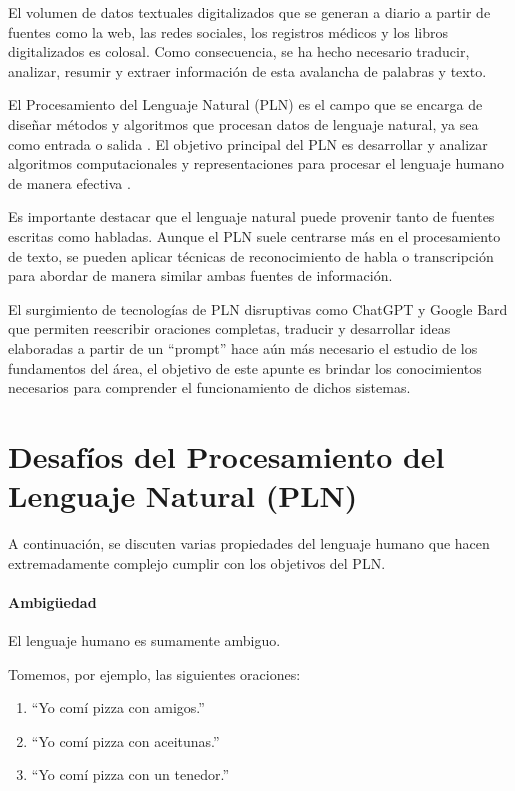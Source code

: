 El volumen de datos textuales digitalizados que se generan a diario a partir de fuentes como la web, las redes sociales, los registros médicos y los libros digitalizados es colosal. Como consecuencia, se ha hecho necesario traducir, analizar, resumir y extraer información de esta avalancha de palabras y texto.

El Procesamiento del Lenguaje Natural (PLN) es el campo que se encarga de diseñar métodos y algoritmos que procesan datos de lenguaje natural, ya sea como entrada o salida \cite{goldberg2017neural}. El objetivo principal del PLN es desarrollar y analizar algoritmos computacionales y representaciones para procesar el lenguaje humano de manera efectiva \cite{jacobbook}.

Es importante destacar que el lenguaje natural puede provenir tanto de fuentes escritas como habladas. Aunque el PLN suele centrarse más en el procesamiento de texto, se pueden aplicar técnicas de reconocimiento de habla o transcripción para abordar de manera similar ambas fuentes de información.

El surgimiento de tecnologías de PLN disruptivas como ChatGPT y Google Bard que permiten reescribir oraciones completas, traducir y desarrollar ideas elaboradas a partir de un ``prompt'' hace aún más necesario el estudio de los fundamentos del área, el objetivo de este apunte es brindar los conocimientos necesarios para comprender el funcionamiento de dichos sistemas.

\section{Desafíos del Procesamiento del Lenguaje Natural (PLN)}

A continuación, se discuten varias propiedades del lenguaje humano que hacen extremadamente complejo cumplir con los objetivos del PLN.

\paragraph{Ambigüedad}

El lenguaje humano es sumamente ambiguo. 

\begin{example}
Tomemos, por ejemplo, las siguientes oraciones:

\begin{enumerate}
  \item ``Yo comí pizza con amigos.''
  \item ``Yo comí pizza con aceitunas.''
  \item ``Yo comí pizza con un tenedor.''
\end{enumerate} 
\end{example}



